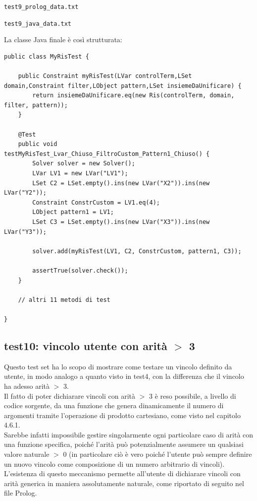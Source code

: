 \texttt{test9\_prolog\_data.txt}


\texttt{test9\_java\_data.txt}


\clearpage

La classe Java finale è così strutturata:\\
\begin{lstlisting}
public class MyRisTest {

	public Constraint myRisTest(LVar controlTerm,LSet domain,Constraint filter,LObject pattern,LSet insiemeDaUnificare) {
		return insiemeDaUnificare.eq(new Ris(controlTerm, domain, filter, pattern));
	}
	
	@Test
	public void testMyRisTest_Lvar_Chiuso_FiltroCustom_Pattern1_Chiuso() {
		Solver solver = new Solver();
		LVar LV1 = new LVar("LV1");
		LSet C2 = LSet.empty().ins(new LVar("X2")).ins(new LVar("Y2"));
		Constraint ConstrCustom = LV1.eq(4);
		LObject pattern1 = LV1;
		LSet C3 = LSet.empty().ins(new LVar("X3")).ins(new LVar("Y3"));
		
		solver.add(myRisTest(LV1, C2, ConstrCustom, pattern1, C3));
		
		assertTrue(solver.check());
	}
	
	// altri 11 metodi di test
	
}

\end{lstlisting}

\clearpage

\subsection{test10: vincolo utente con arità $>$ 3}
Questo test set ha lo scopo di mostrare come testare un vincolo definito da utente, in modo analogo a quanto visto in test4, con la differenza che il vincolo ha adesso arità $>$ 3.\\
Il fatto di poter dichiarare vincoli con arità $>$ 3 è reso possibile, a livello di codice sorgente, da una funzione che genera dinamicamente il numero di argomenti tramite l'operazione di prodotto cartesiano, come visto nel capitolo 4.6.1.\\
Sarebbe infatti impossibile gestire singolarmente ogni particolare caso di arità con una funzione specifica, poiché l'arità può potenzialmente assumere un qualsiasi valore naturale $>$ 0 (in particolare ciò è vero poiché l'utente può sempre definire un nuovo vincolo come composizione di un numero arbitrario di vincoli).\\
L'esistenza di questo meccanismo permette all'utente di dichiarare vincoli con arità generica in maniera assolutamente naturale, come riportato di seguito nel file Prolog.\\

